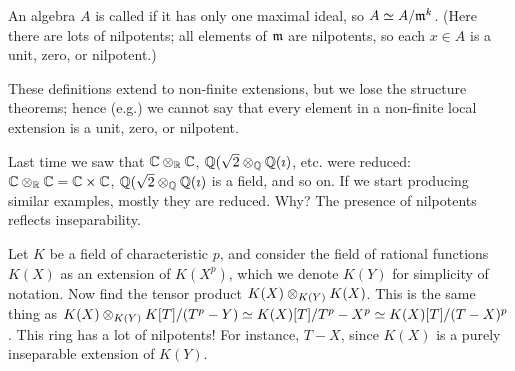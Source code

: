 \begin{dfn}
An algebra $A$ is called  if it has only one maximal ideal, so $A \simeq A / \mathfrak{m}^{k}$.
(Here there are lots of nilpotents; all elements of $\mathfrak{m}$ are nilpotents, so each $x \in A$ is a unit, zero, or nilpotent.)
\begin{dfn}
These definitions extend to non-finite extensions, but we lose the structure theorems; hence (e.g.) we cannot say that every element in a non-finite local extension is a unit, zero, or nilpotent.

Last time we saw that $\mathbb{C} \otimes_{\mathbb{R}} \mathbb{C}$, $\mathbb{Q}(\sqrt{2} \otimes_{\mathbb{Q}} \mathbb{Q}(\imath)$, etc. were reduced: $\mathbb{C} \otimes_{\mathbb{R}} \mathbb{C} = \mathbb{C} \times \mathbb{C}$, $\mathbb{Q}(\sqrt{2} \otimes_{\mathbb{Q}} \mathbb{Q}(\imath)$ is a field, and so on.
If we start producing similar examples, mostly they are reduced.
Why?
The presence of nilpotents reflects inseparability.

Let $K$ be a field of characteristic $p$, and consider the field of rational functions $K(X)$ as an extension of $K(X^p)$, which we denote $K(Y)$ for simplicity of notation.
Now find the tensor product $K(X) \otimes_{K(Y)} K(X)$.
This is the same thing as $K(X) \otimes_{K(Y)} K[T] / (T^p - Y) \simeq K(X)[T] / T^p - X^p \simeq K(X)[T] / (T - X)^p$.
This ring has a lot of nilpotents!
For instance, $T - X$, since $K(X)$ is a purely inseparable extension of $K(Y)$.


\end{dfn}
\end{dfn}
